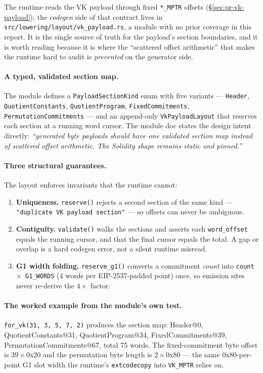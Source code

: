 The runtime reads the VK payload through fixed \texttt{*\_MPTR}
offsets (§\ref{sec:pr-vk-payload}); the \emph{codegen} side of
that contract lives in
\texttt{src/\allowbreak{}lowering/\allowbreak{}layout/\allowbreak{}vk\_\allowbreak{}payload.rs}, a module with no
prior coverage in this report. It is the single source of truth
for the payload's section boundaries, and it is worth reading
because it is where the ``scattered offset arithmetic'' that
makes the runtime hard to audit is \emph{prevented} on the
generator side.

\paragraph{A typed, validated section map.}
The module defines a \texttt{PayloadSectionKind} enum with five
variants --- \texttt{Header}, \texttt{QuotientConstants},
\texttt{QuotientProgram}, \texttt{FixedCommitments},
\texttt{PermutationCommitments} --- and an append-only
\texttt{VkPayloadLayout} that reserves each section at a running
word cursor. The module doc states the design intent directly:
\emph{``generated byte payloads should have one validated section
map instead of scattered offset arithmetic. The Solidity shape
remains static and pinned.''}

\paragraph{Three structural guarantees.}
The layout enforces invariants that the runtime cannot:
\begin{enumerate}
\item \textbf{Uniqueness.} \texttt{reserve()} rejects a second
section of the same kind --- \texttt{"duplicate VK payload
section"} --- so offsets can never be ambiguous.
\item \textbf{Contiguity.} \texttt{validate()} walks the sections
and asserts each \texttt{word\_offset} equals the running cursor,
and that the final cursor equals the total. A gap or overlap is a
hard codegen error, not a silent runtime misread.
\item \textbf{G1 width folding.} \texttt{reserve\_g1()} converts a
commitment \emph{count} into \texttt{count $\times$ G1\_\allowbreak{}WORDS}
(4 words per EIP-2537-padded point) once, so emission sites never
re-derive the $4\times$ factor.
\end{enumerate}

\paragraph{The worked example from the module's own test.}
\texttt{for\_\allowbreak{}vk(31, 3, 5, 7, 2)} produces the section map:
Header@0, QuotientConstants@31, QuotientProgram@34,
FixedCommitments@39, PermutationCommitments@67, total 75 words.
The fixed-commitment byte offset is $39\times0\text{x}20$ and the
permutation byte length is $2\times0\text{x}80$ --- the same
$0\text{x}80$-per-point G1 slot width the runtime's
\texttt{extcodecopy} into \texttt{VK\_MPTR} relies on.

